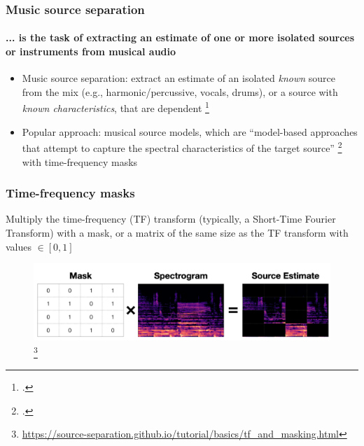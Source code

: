 \documentclass[usenames,dvipsnames]{beamer}
\begin{document}
\begin{frame}
	\frametitle{Music source separation}
	\framesubtitle{... is the task of extracting an estimate of one or more isolated sources or instruments from musical audio}
	\begin{itemize}
	       \item
		       Music source separation: extract an estimate of an isolated \textit{known} source from the mix (e.g., harmonic/percussive, vocals, drums), or a source with \textit{known characteristics}, that are dependent \footcite[1]{musicsepintro1}
	       \item
			Popular approach: musical source models, which are ``model-based approaches that attempt to capture the spectral characteristics of the target source'' \footcite[36]{musicsepgood} with time-frequency masks
	\end{itemize}
	\begin{figure}
		\centering
		\vspace{-1.25em}
	\end{figure}
\end{frame}

\begin{frame}
	\frametitle{Time-frequency masks}
	Multiply the time-frequency (TF) transform (typically, a Short-Time Fourier Transform) with a mask, or a matrix of the same size as the TF transform with values $\in [0, 1]$
	\begin{figure}
		\centering
		\includegraphics[width=12cm]{./images-mss/mask_simple.png}\footnote{\url{https://source-separation.github.io/tutorial/basics/tf_and_masking.html}}
	\end{figure}
\end{frame}
\end{document}
